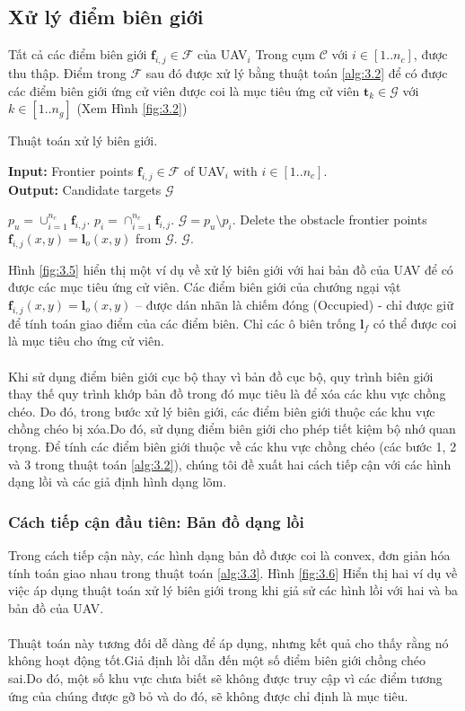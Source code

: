 \documentclass[11pt,openany]{book}
\begin{document}
\subsection{Xử lý điểm biên giới}
Tất cả các điểm biên giới $\mathbf{f}_{i,j} \in \mathcal{F}$ của UAV$_i$ Trong cụm $\mathcal{C}$ với $i \in [1..n_c]$, được thu thập. Điểm trong $\mathcal{F}$ sau đó được xử lý bằng thuật toán \ref{alg:3.2} để có được các điểm biên giới ứng cử viên được coi là mục tiêu ứng cử viên $\mathbf{t}_k \in \mathcal{G}$ với $k \in [1..n_g]$ (Xem Hình \ref{fig:3.2})
\begin{algorithm}[H]
    \caption{Thuật toán xử lý biên giới.}
    \label{alg:3.2}
    \hspace*{\algorithmicindent} \textbf{Input:} Frontier points $\mathbf{f}_{i,j} \in \mathcal{F}$ of UAV$_i$ with $i \in [1..n_c]$. \\
    \hspace*{\algorithmicindent} \textbf{Output:} Candidate targets $\mathcal{G}$
    \begin{algorithmic}[1]
        \STATE $p_u=\cup_{i=1}^{n_c}\mathbf{f}_{i,j}$.
        \STATE $p_i=\cap_{i=1}^{n_c}\mathbf{f}_{i,j}$.
        \STATE $\mathcal{G}=p_u\setminus p_i$.
        \STATE Delete the obstacle frontier points $\mathbf{f}_{i,j}(x,y)=\mathbf{l}_o(x,y)$ from $\mathcal{G}$.
        \RETURN $\mathcal{G}$.
    \end{algorithmic}
\end{algorithm}
Hình \ref{fig:3.5} hiển thị một ví dụ về xử lý biên giới với hai bản đồ của UAV để có được các mục tiêu ứng cử viên. Các điểm biên giới của chướng ngại vật $\mathbf{f}_{i,j}(x,y)=\mathbf{l}_o(x,y)$ – được dán nhãn là chiếm đóng (Occupied) - chỉ được giữ để tính toán giao điểm của các điểm biên. Chỉ các ô biên trống $\mathbf{l}_f$ có thể được coi là mục tiêu cho ứng cử viên.\\\\
Khi sử dụng điểm biên giới cục bộ thay vì bản đồ cục bộ, quy trình biên giới thay thế quy trình khớp bản đồ trong đó mục tiêu là để xóa các khu vực chồng chéo. Do đó, trong bước xử lý biên giới, các điểm biên giới thuộc các khu vực chồng chéo bị xóa.Do đó, sử dụng điểm biên giới cho phép tiết kiệm bộ nhớ quan trọng. Để tính các điểm biên giới thuộc về các khu vực chồng chéo (các bước 1, 2 và 3 trong thuật toán \ref{alg:3.2}), chúng tôi đề xuất hai cách tiếp cận với các hình dạng lồi và các giả định hình dạng lõm.
\subsubsection{Cách tiếp cận đầu tiên: Bản đồ dạng lồi}
Trong cách tiếp cận này, các hình dạng bản đồ được coi là convex, đơn giản hóa tính toán giao nhau trong thuật toán \ref{alg:3.3}. Hình \ref{fig:3.6} Hiển thị hai ví dụ về việc áp dụng thuật toán xử lý biên giới trong khi giả sử các hình lồi với hai và ba bản đồ của UAV.\\\\
Thuật toán này tương đối dễ dàng để áp dụng, nhưng kết quả cho thấy rằng nó không hoạt động tốt.Giả định lồi dẫn đến một số điểm biên giới chồng chéo sai.Do đó, một số khu vực chưa biết sẽ không được truy cập vì các điểm tương ứng của chúng được gỡ bỏ và do đó, sẽ không được chỉ định là mục tiêu.
\end{document}
